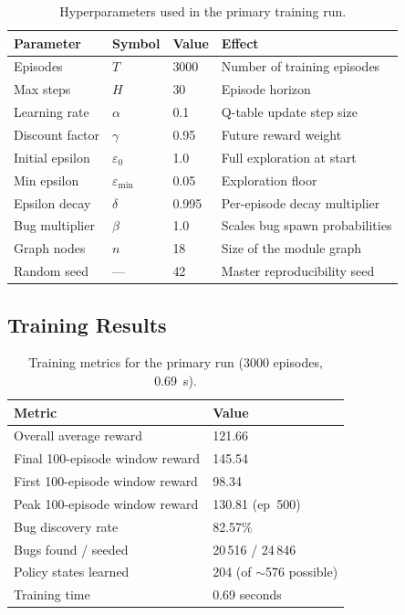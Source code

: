 \documentclass[12pt,a4paper]{report}
\begin{document}
\begin{table}[H]
  \centering
  \caption{Hyperparameters used in the primary training run.}
  \label{tab:hyperparams}
  \begin{tabular}{llll}
    \toprule
    \textbf{Parameter} & \textbf{Symbol} & \textbf{Value} & \textbf{Effect} \\
    \midrule
    Episodes        & $T$            & 3000    & Number of training episodes \\
    Max steps       & $H$            & 30      & Episode horizon \\
    Learning rate   & $\alpha$       & 0.1     & Q-table update step size \\
    Discount factor & $\gamma$       & 0.95    & Future reward weight \\
    Initial epsilon & $\varepsilon_0$& 1.0     & Full exploration at start \\
    Min epsilon     & $\varepsilon_{\min}$ & 0.05 & Exploration floor \\
    Epsilon decay   & $\delta$       & 0.995   & Per-episode decay multiplier \\
    Bug multiplier  & $\beta$        & 1.0     & Scales bug spawn probabilities \\
    Graph nodes     & $n$            & 18      & Size of the module graph \\
    Random seed     & ---            & 42      & Master reproducibility seed \\
    \bottomrule
  \end{tabular}
\end{table}

\subsection{Training Results}

\begin{table}[H]
  \centering
  \caption{Training metrics for the primary run (3000 episodes, 0.69~s).}
  \label{tab:train_results}
  \begin{tabular}{ll}
    \toprule
    \textbf{Metric} & \textbf{Value} \\
    \midrule
    Overall average reward          & 121.66  \\
    Final 100-episode window reward & 145.54  \\
    First 100-episode window reward & 98.34   \\
    Peak 100-episode window reward  & 130.81 (ep~500) \\
    Bug discovery rate              & 82.57\% \\
    Bugs found / seeded             & 20\,516 / 24\,846 \\
    Policy states learned           & 204 (of $\sim$576 possible) \\
    Training time                   & 0.69 seconds \\
    \bottomrule
  \end{tabular}
\end{table}
\end{document}
